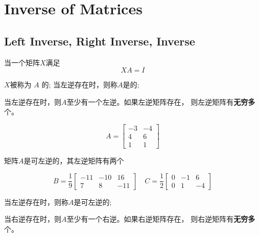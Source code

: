 \chapter{Inverse of Matrices}

\section{Left Inverse, Right Inverse, Inverse}

\begin{definition}[$A$的左逆]
    当一个矩阵$X$满足 \begin{equation} X A=I \end{equation} 
    
    $X$被称为 $ A $ 的; 当左逆存在时，则称$A$是的;
\end{definition}

当左逆存在时，则$A$至少有一个左逆。如果左逆矩阵存在， 则左逆矩阵有\textbf{无穷多}个。

\begin{example}
    \begin{equation} A=\left[\begin{array}{cc}-3 & -4 \\ 4 & 6 \\ 1 & 1\end{array}\right] \end{equation}

    矩阵$A$是可左逆的，其左逆矩阵有两个

    \begin{equation} B=\frac{1}{9}\left[\begin{array}{ccc}-11 & -10 & 16 \\ 7 & 8 & -11\end{array}\right] \quad C=\frac{1}{2}\left[\begin{array}{ccc}0 & -1 & 6 \\ 0 & 1 & -4\end{array}\right] \end{equation}
\end{example}

\begin{definition}[$A$的右逆]
    当左逆存在时，则称$A$是可左逆的;
\end{definition}

当右逆存在时，则$A$至少有一个右逆。如果右逆矩阵存在， 则右逆矩阵有\textbf{无穷多}个。


